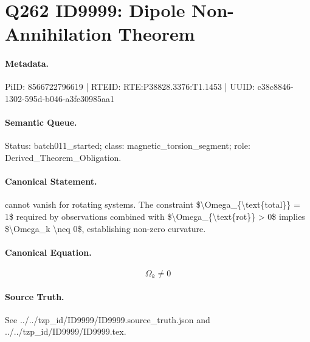 \section*{Q262 ID9999: Dipole Non-Annihilation Theorem}
\paragraph{Metadata.}
PiID: 8566722796619 | RTEID: RTE:P38828.3376:T1.1453 | UUID: c38c8846-1302-595d-b046-a3fc30985aa1

\paragraph{Semantic Queue.}
Status: batch011\_started; class: magnetic\_torsion\_segment; role: Derived\_Theorem\_Obligation.

\paragraph{Canonical Statement.}
cannot vanish for rotating systems. The constraint \$\textbackslash{}Omega\_\{\textbackslash{}text\{total\}\} = 1\$ required by observations combined with \$\textbackslash{}Omega\_\{\textbackslash{}text\{rot\}\} > 0\$ implies \$\textbackslash{}Omega\_k \textbackslash{}neq 0\$, establishing non-zero curvature.

\paragraph{Canonical Equation.}
\[
\Omega_k \neq 0
\]

\paragraph{Source Truth.}
See ../../tzp\_id/ID9999/ID9999.source\_truth.json and ../../tzp\_id/ID9999/ID9999.tex.
